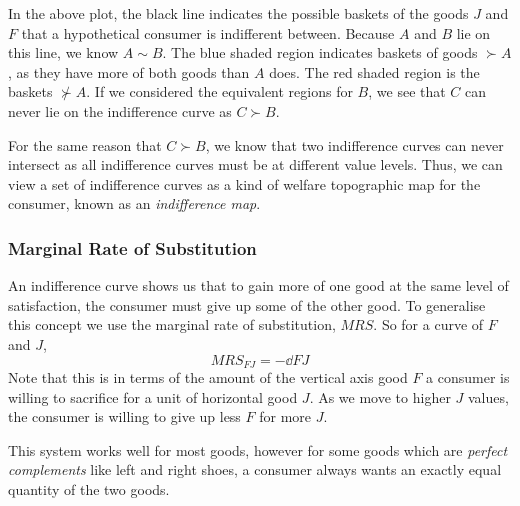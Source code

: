 \documentclass[12pt]{report}
\begin{document}
\begin{flushleft}
In the above plot, the black line indicates the possible baskets of the goods
\(J\) and \(F\) that a hypothetical consumer is indifferent between. Because
\(A\) and \(B\) lie on this line, we know \(A \sim B\). The blue shaded region
indicates baskets of goods \(\succ A\), as they have more of both goods than
\(A\) does. The red shaded region is the baskets \(\nsucc A\). If we considered
the equivalent regions for \(B\), we see that \(C\) can never lie on the
indifference curve as \(C \succ B\). \par
For the same reason that \(C \succ B\), we
know that two indifference curves can never intersect as all indifference curves
must be at different value levels. Thus, we can view a set of indifference
curves as a kind of welfare topographic map for the consumer, known as an
\textit{indifference map}.

\subsubsection*{Marginal Rate of Substitution}

An indifference curve shows us that to gain more of one good at the same level
of satisfaction, the consumer must give up some of the other good. To generalise
this concept we use the marginal rate of substitution, \(MRS\). So for a curve
of \(F\) and \(J\),
\[MRS_{FJ} = -\dd{F}{J}\]
Note that this is in terms of the amount of the vertical axis good \(F\) a
consumer is willing to sacrifice for a unit of horizontal good \(J\). As we move
to higher \(J\) values, the consumer is willing to give up less \(F\) for more
\(J\). \par
This system works well for most goods, however for some goods which are
\textit{perfect complements} like left and right shoes, a consumer always wants
an exactly equal quantity of the two goods.

\end{flushleft}
\end{document}
